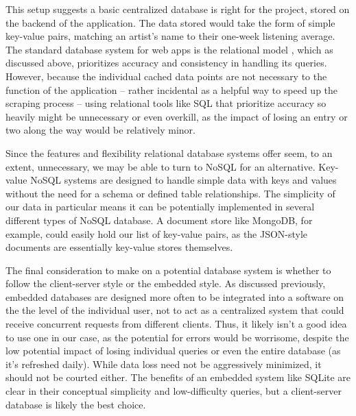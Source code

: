 This setup suggests a basic centralized database is right for the project, stored on the backend of the application. The data stored would take the form of simple key-value pairs, matching an artist's name to their one-week listening average. The standard database system for web apps is the relational model \cite{adedeji_full-stack_2023}, which as discussed above, prioritizes accuracy and consistency in handling its queries. However, because the individual cached data points are not necessary to the function of the application -- rather incidental as a helpful way to speed up the scraping process -- using relational tools like SQL that prioritize accuracy so heavily might be unnecessary or even overkill, as the impact of losing an entry or two along the way would be relatively minor.

Since the features and flexibility relational database systems offer seem, to an extent, unnecessary, we may be able to turn to NoSQL for an alternative. Key-value NoSQL systems are designed to handle simple data with keys and values without the need for a schema or defined table relationships. The simplicity of our data in particular means it can be potentially implemented in several different types of NoSQL database. A document store like MongoDB, for example, could easily hold our list of key-value pairs, as the JSON-style documents are essentially key-value stores themselves.

The final consideration to make on a potential database system is whether to follow the client-server style or the embedded style. As discussed previously, embedded databases are designed more often to be integrated into a software on the the level of the individual user, not to act as a centralized system that could receive concurrent requests from different clients. Thus, it likely isn't a good idea to use one in our case, as the potential for errors would be worrisome, despite the low potential impact of losing individual queries or even the entire database (as it's refreshed daily). While data loss need not be aggressively minimized, it should not be courted either. The benefits of an embedded system like SQLite are clear in their conceptual simplicity and low-difficulty queries, but a client-server database is likely the best choice.